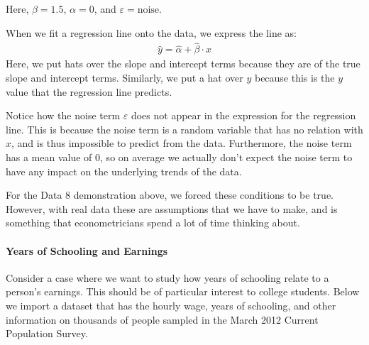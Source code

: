 \documentclass[letterpaper,10pt,english]{jupyterBook}
\begin{document}
\sphinxAtStartPar
Here, \(\beta = 1.5\), \(\alpha = 0\), and \(\varepsilon = \text{noise}\).

\sphinxAtStartPar
When we fit a regression line onto the data, we express the line as:
\begin{equation*}
\begin{split}
\hat{y} = \hat{\alpha} + \hat{\beta} \cdot x
\end{split}
\end{equation*}
\sphinxAtStartPar
Here, we put hats over the slope and intercept terms because they are  of the true slope and intercept terms. Similarly, we put a hat over \(y\) because this is the \(y\) value that the regression line predicts.

\sphinxAtStartPar
Notice how the noise term \(\varepsilon\) does not appear in the expression for the regression line. This is because the noise term is a random variable that has no relation with \(x\), and is thus impossible to predict from the data. Furthermore, the noise term has a mean value of 0, so on average we actually don’t expect the noise term to have any impact on the underlying trends of the data.

\sphinxAtStartPar
For the Data 8 demonstration above, we forced these conditions to be true. However, with real data these are assumptions that we have to make, and is something that econometricians spend a lot of time thinking about.


\paragraph{Years of Schooling and Earnings}
\label{\detokenize{content/11-econometrics/single-variable:years-of-schooling-and-earnings}}
\sphinxAtStartPar
Consider a case where we want to study how years of schooling relate to a person’s earnings. This should be of particular interest to college students. Below we import a dataset that has the hourly wage, years of schooling, and other information on thousands of people sampled in the March 2012 Current Population Survey.

\begin{sphinxVerbatim}[commandchars=\\\{\}]
  
\end{sphinxVerbatim}
\end{document}
